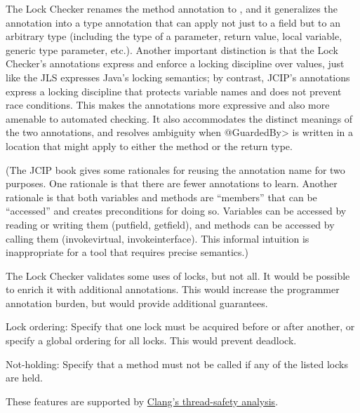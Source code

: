 The Lock Checker renames the method annotation to
, and it generalizes the
 annotation into a type annotation
that can apply not just to a field but to an arbitrary type (including the
type of a parameter, return value, local variable, generic type parameter,
etc.).  Another important distinction is that the Lock Checker's
annotations express and enforce a locking discipline over values, just like
the JLS expresses Java's locking semantics; by contrast, JCIP's annotations
express a locking discipline that protects variable names and does not
prevent race conditions.
  This makes the annotations more expressive and also more amenable
to automated checking.  It also accommodates the distinct
meanings of the two annotations, and resolves ambiguity when \<@GuardedBy>
is written in a location that might apply to either the method or the
return type.

(The JCIP book gives some rationales for reusing the annotation name for
two purposes.  One rationale is
that there are fewer annotations to learn.  Another rationale is
that both variables and methods are ``members'' that can be ``accessed''
and  creates preconditions for doing so.
Variables can be accessed by reading or writing them (putfield, getfield),
and methods can be accessed by calling them (invokevirtual,
invokeinterface).  This informal intuition is
inappropriate for a tool that requires precise semantics.)




The Lock Checker validates some uses of locks, but not all.  It would be
possible to enrich it with additional annotations.  This would increase the
programmer annotation burden, but would provide additional guarantees.

Lock ordering:  Specify that one lock must be acquired before or after
another, or specify a global ordering for all locks.  This would prevent
deadlock.

Not-holding:  Specify that a method must not be called if any of the listed
locks are held.

These features are supported by
\href{https://clang.llvm.org/docs/ThreadSafetyAnalysis.html}{Clang's
  thread-safety analysis}.


